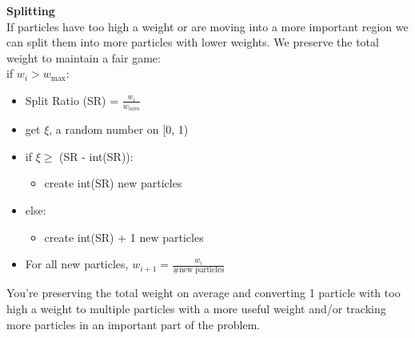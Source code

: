 \documentclass[12pt]{article}
\begin{document}
\textbf{Splitting}\\
If particles have too high a weight or are moving into a more important region we can split them into more particles with lower weights. We preserve the total weight to maintain a fair game:\\
\noindent\makebox[\linewidth]{\rule{\textwidth}{0.4pt}}
if $w_i > w_{\max}$:
\begin{itemize}
\item Split Ratio (SR) = $\frac{w_i}{w_{nom}}$
\item get $\xi$, a random number on [0, 1)
\item if $\xi \geq$ (SR - int(SR)):
  \begin{itemize}
  \item create int(SR) new particles
  \end{itemize}
\item else:
  \begin{itemize}
  \item create int(SR) + 1 new particles
  \end{itemize}
\item For all new particles, $w_{i+1} = \frac{w_i}{\# \text{new particles}}$
\end{itemize}
\noindent\makebox[\linewidth]{\rule{\textwidth}{0.4pt}}
%
You're preserving the total weight on average and converting 1 particle with too high a weight to multiple particles with a more useful weight and/or tracking more particles in an important part of the problem. 

\clearpage
\end{document}
